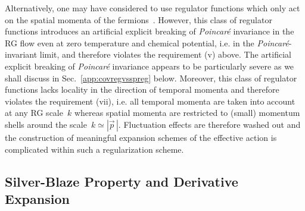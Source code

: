 \documentclass[prd,english,preprintnumbers,amsmath,amssymb,nofootinbib,twocolumn,superscriptaddress]{revtex4-1}
\begin{document}
{{Alternatively, one may have considered to use regulator functions which only act on the spatial 
momenta of the fermions~\cite{Braun:2003ii,Schaefer:2004en,Blaizot:2006rj,Litim:2006ag}. However,
this class of regulator functions introduces an artificial explicit breaking of {\it Poincar\'{e}} invariance in the RG flow even at zero temperature and chemical
potential, i.e. in the {\it Poincar\'{e}}-invariant limit, and therefore violates the requirement (v) above. The artificial 
explicit breaking of {\it Poincar\'{e}} invariance appears to be particularly severe as we {shall discuss in Sec.~\ref{app:covregvsspreg} below.} 
Moreover, this class of regulator functions lacks locality in 
the direction of temporal momenta and therefore violates the requirement (vii), i.e.
all temporal momenta are taken into account at any RG scale~$k$ whereas spatial momenta are restricted
to (small) momentum shells around the scale~$k\simeq |\vec{p}^{\,}|$. Fluctuation effects are therefore washed out
and the construction of meaningful expansion schemes of the effective action is complicated within such a regularization scheme.

%
\subsection{Silver-Blaze Property and Derivative Expansion}\label{sec:sbpdexp}
%

}}
\end{document}
